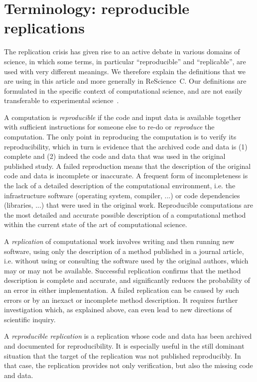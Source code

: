\documentclass[runningheads]{llncs}
\begin{document}
\section{Terminology: reproducible replications}

The replication crisis has given rise to an active debate in various domains of science, in which some terms, in particular ``reproducible'' and ``replicable'', are used with very different meanings. We therefore explain the definitions that we are using in this article and more generally in ReScience~C. Our definitions are formulated in the specific context of computational science, and are not easily transferable to experimental science~\cite{HinsenScientificsoftwaredifferent2018}.

A computation is \textit{reproducible} if the code and input data is available together with sufficient instructions for someone else to re-do or \textit{reproduce} the computation. The only point in reproducing the computation is to verify its reproducibility, which in turn is evidence that the archived code and data is (1) complete and (2) indeed the code and data that was used in the original published study. A failed reproduction means that the description of the original code and data is incomplete or inaccurate. A frequent form of incompleteness is the lack of a detailed description of the computational environment, i.e. the infrastructure software (operating system, compiler, ...) or code dependencies (libraries, ...) that were used in the original work. Reproducible computations are the most detailed and accurate possible description of a computational method within the current state of the art of computational science.

A \textit{replication} of computational work involves writing and then running new software, using only the description of a method published in a journal article, i.e. without using or consulting the software used by the original authors, which may or may not be available. Successful replication confirms that the method description is complete and accurate, and significantly reduces the probability of an error in either implementation. A failed replication can be caused by such errors or by an inexact or incomplete method description. It requires further investigation which, as explained above, can even lead to new directions of scientific inquiry.

A \textit{reproducible replication} is a replication whose code and data has been archived and documented for reproducibility. It is especially useful in the still dominant situation that the target of the replication was not published reproducibly. In that case, the replication provides not only verification, but also the missing code and data.
\end{document}
